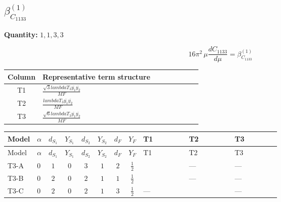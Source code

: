 \documentclass[8pt]{article}
\begin{document}
\begin{landscape}
\section*{$\beta_{C_{1133}}^{(1)}$}
\noindent\textbf{Quantity: }$\mathrm{1,1,3,3}$\par\smallskip
\[16\pi^2\,\mu\frac{d C_{1133}}{d\mu}=\beta_{C_{1133}}^{(1)}\]
\begin{center}
\begin{tabular}{@{}c >{\raggedright\arraybackslash}p{0.82\linewidth}@{}}
\toprule
Column & Representative term structure \\
\midrule
T1 & \(\displaystyle \frac{\sqrt{3} lambdaT_{3} \overline{y_{1}} \overline{y_{2}}}{MF}\) \\
\midrule
T2 & \(\displaystyle \frac{lambdaT_{3} \overline{y_{1}} \overline{y_{2}}}{MF}\) \\
\midrule
T3 & \(\displaystyle \frac{\sqrt{6} lambdaT_{3} \overline{y_{1}} \overline{y_{2}}}{MF}\) \\
\midrule
\bottomrule
\end{tabular}
\end{center}
\smallskip
\tiny
\begin{longtable}{@{}llcccccc >{\raggedright\arraybackslash}p{0.21\linewidth} >{\raggedright\arraybackslash}p{0.21\linewidth} >{\raggedright\arraybackslash}p{0.21\linewidth}@{}}
\toprule
Model & $\alpha$ & $d_{S_1}$ & $Y_{S_1}$ & $d_{S_2}$ & $Y_{S_2}$ & $d_F$ & $Y_F$ & T1 & T2 & T3 \\
\midrule
\endfirsthead
\toprule
Model & $\alpha$ & $d_{S_1}$ & $Y_{S_1}$ & $d_{S_2}$ & $Y_{S_2}$ & $d_F$ & $Y_F$ & T1 & T2 & T3 \\
\midrule
\endhead
T3-A & $0$ & $1$ & $0$ & $3$ & $1$ & $2$ & $\frac{1}{2}$ & \scriptsize\adjustbox{max width=\linewidth}{$\begin{gathered} \frac{2 \sqrt{3} lambdaT_{3} \overline{y_{1}} \overline{y_{2}}}{3 MF}\end{gathered}$} & --- & --- \\
\midrule
T3-B & $0$ & $2$ & $0$ & $2$ & $1$ & $1$ & $\frac{1}{2}$ & \scriptsize\adjustbox{max width=\linewidth}{$\begin{gathered} \frac{2 \sqrt{3} lambdaT_{3} \overline{y_{1}} \overline{y_{2}}}{3 MF}\end{gathered}$} & --- & --- \\
\midrule
T3-C & $0$ & $2$ & $0$ & $2$ & $1$ & $3$ & $\frac{1}{2}$ & --- & \scriptsize\adjustbox{max width=\linewidth}{$\begin{gathered} - \frac{2 lambdaT_{3} \overline{y_{1}} \overline{y_{2}}}{3 MF}\end{gathered}$} & --- \\

\end{longtable}
\end{landscape}
\end{document}
